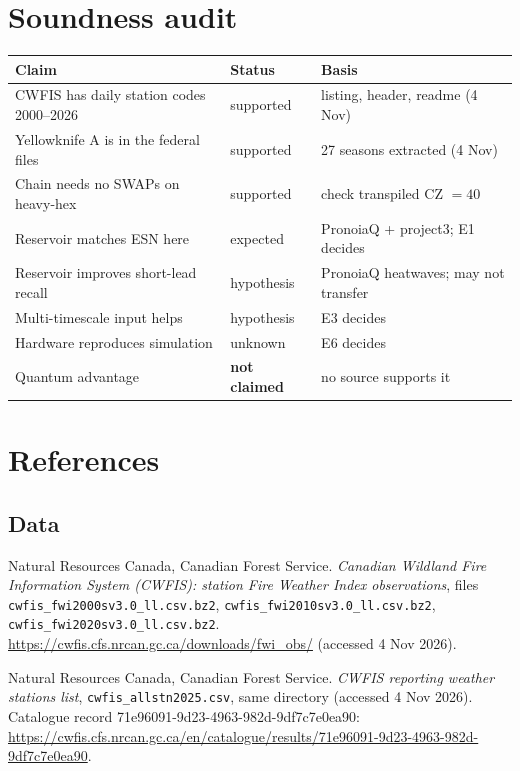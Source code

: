 \documentclass[11pt,a4paper]{article}
\newcommand{\code}[1]{\texttt{\small #1}}
\begin{document}
\section{Soundness audit}

\begin{center}\small
\begin{tabularx}{\linewidth}{@{}Y l Y@{}}
\toprule
\textbf{Claim} & \textbf{Status} & \textbf{Basis}\\
\midrule
CWFIS has daily station codes 2000--2026 & supported & listing, header, readme (4 Nov)\\
Yellowknife A is in the federal files & supported & 27 seasons extracted (4 Nov)\\
Chain needs no SWAPs on heavy-hex & supported & check transpiled CZ $=40$\\
Reservoir matches ESN here & expected & PronoiaQ + project3; E1 decides\\
Reservoir improves short-lead recall & hypothesis & PronoiaQ heatwaves; may not transfer\\
Multi-timescale input helps & hypothesis & E3 decides\\
Hardware reproduces simulation & unknown & E6 decides\\
Quantum advantage & \textbf{not claimed} & no source supports it\\
\bottomrule
\end{tabularx}
\end{center}

\hypertarget{refs}{}
\section*{References}

\subsection*{Data}
\begin{enumerate}[label={[D\arabic*]},leftmargin=3em]
\item Natural Resources Canada, Canadian Forest Service. \emph{Canadian Wildland Fire Information System (CWFIS):
  station Fire Weather Index observations}, files \code{cwfis\_fwi2000sv3.0\_ll.csv.bz2},
  \code{cwfis\_fwi2010sv3.0\_ll.csv.bz2}, \code{cwfis\_fwi2020sv3.0\_ll.csv.bz2}.
  \url{https://cwfis.cfs.nrcan.gc.ca/downloads/fwi_obs/} (accessed 4 Nov 2026).
\item Natural Resources Canada, Canadian Forest Service. \emph{CWFIS reporting weather stations list},
  \code{cwfis\_allstn2025.csv}, same directory (accessed 4 Nov 2026). Catalogue record
  71e96091-9d23-4963-982d-9df7c7e0ea90:
  \url{https://cwfis.cfs.nrcan.gc.ca/en/catalogue/results/71e96091-9d23-4963-982d-9df7c7e0ea90}.
\end{enumerate}
\end{document}
